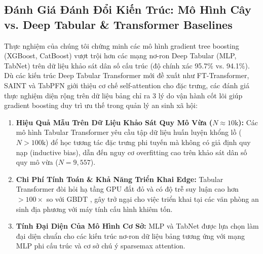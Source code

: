 \documentclass[conference]{IEEEtran}
\begin{document}
\subsection{Đánh Giá Đánh Đổi Kiến Trúc: Mô Hình Cây vs. Deep Tabular & Transformer Baselines}
Thực nghiệm của chúng tôi chứng minh các mô hình gradient tree boosting (XGBoost, CatBoost) vượt trội hơn các mạng nơ-ron Deep Tabular (MLP, TabNet) trên dữ liệu khảo sát dân số cấu trúc (độ chính xác 95.7\% vs. 94.1\%). Dù các kiến trúc Deep Tabular Transformer mới đề xuất như FT-Transformer, SAINT và TabPFN giới thiệu cơ chế self-attention cho đặc trưng, các đánh giá thực nghiệm diện rộng trên dữ liệu bảng \cite{b_tabular_dl} chỉ ra 3 lý do vận hành cốt lõi giúp gradient boosting duy trì ưu thế trong quản lý an sinh xã hội:
\begin{enumerate}
\item \textbf{Hiệu Quả Mẫu Trên Dữ Liệu Khảo Sát Quy Mô Vừa ($N \approx 10\text{k}$):} Các mô hình Tabular Transformer yêu cầu tập dữ liệu huấn luyện khổng lồ ($N > 100\text{k}$) để học tương tác đặc trưng phi tuyến mà không có giả định quy nạp (inductive bias), dẫn đến nguy cơ overfitting cao trên khảo sát dân số quy mô vừa ($N=9,557$).
\item \textbf{Chi Phí Tính Toán & Khả Năng Triển Khai Edge:} Tabular Transformer đòi hỏi hạ tầng GPU đắt đỏ và có độ trễ suy luận cao hơn $>100\times$ so với GBDT \cite{b_tabular_dl}, gây trở ngại cho việc triển khai tại các văn phòng an sinh địa phương với máy tính cấu hình khiêm tốn.
\item \textbf{Tính Đại Diện Của Mô Hình Cơ Sở:} MLP và TabNet được lựa chọn làm đại diện chuẩn cho các kiến trúc nơ-ron dữ liệu bảng tương ứng với mạng MLP phi cấu trúc và cơ sở chú ý sparsemax attention.
\end{enumerate}
\end{document}
